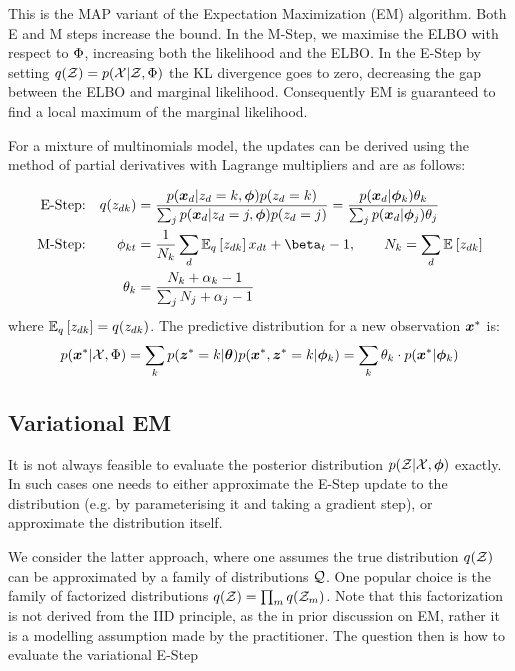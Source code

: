 This is the MAP variant of the Expectation Maximization (EM) algorithm\cite{Dempster1977}. 
Both E and M steps increase the bound. In the M-Step, we maximise the ELBO with respect to $\params$, increasing both the likelihood and the ELBO. In the E-Step by setting $q(\zdat) = p(\xdat|\zdat, \params)$ the KL divergence goes to zero, decreasing the gap between the ELBO and marginal likelihood. Consequently EM is guaranteed to find a local maximum of the marginal likelihood.

For a mixture of multinomials model, the updates can be derived using the method of partial derivatives with Lagrange multipliers and are as follows:

\begin{align}
\text{E-Step:} & & q(z_{dk}) 
& = \frac{p(\xd|z_d = k, \param)p(z_d = k)}{\sum_j p(\xd|z_d = j, \param)p(z_d = j)} 
= \frac{p(\xd | \param_k) \theta_k}{\sum_j p(\xd | \param_j) \theta_j} \label{eqn:mom-estep} \\
\text{M-Step:} 
& & \phi_{kt} & = \frac{1}{N_k} \sum_d \ex{z_{dk}}{q} x_{dt} + \beta_t - 1, \qquad N_k = \sum_d \ex{z_{dk}}{} \\
& & \theta_k & =  \frac{N_k + \alpha_k - 1}{\sum_j N_j + \alpha_j - 1} \label{eqn:mom-mstep}
\end{align}
where $\ex{z_{dk}}{q} = q(z_{dk})$. The predictive distribution for a new observation $\xnew$ is:
\begin{align}
p(\xnew | \xdat, \params)  = \sum_k p(\znew = k | \vv{\theta}) p(\xnew, \znew = k | \param_k) 
= \sum_k \theta_k \cdot p(\xnew | \param_k)
\end{align}


\subsection{Variational EM}
It is not always feasible to evaluate the posterior distribution $p(\zdat|\xdat, \param)$ exactly. In such cases one needs to either approximate the E-Step update to the distribution (e.g. by parameterising it and taking a gradient step), or approximate the distribution itself.

We consider the latter approach, where one assumes the true distribution $q(\zdat)$ can be approximated by a family of distributions $\qfam$. One popular choice is the family of factorized distributions $q(\zdat) = \prod_m q(\zdat_m)$. Note that this factorization is not derived from the IID principle, as the in prior discussion on EM, rather it is a modelling assumption made by the practitioner. The question then is how to evaluate the variational E-Step



